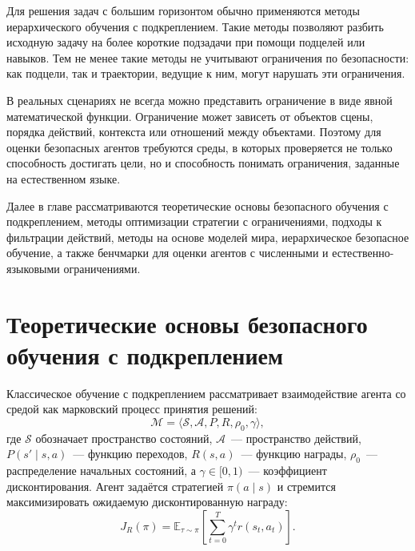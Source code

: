 Для решения задач с большим горизонтом обычно применяются методы иерархического обучения с подкреплением. Такие методы позволяют разбить исходную задачу на более короткие подзадачи при помощи подцелей или навыков. Тем не менее такие методы не учитывают ограничения по безопасности: как подцели, так и траектории, ведущие к ним, могут нарушать эти ограничения.

В реальных сценариях не всегда можно представить ограничение в виде явной математической функции. Ограничение может зависеть от объектов сцены, порядка действий, контекста или отношений между объектами. Поэтому для оценки безопасных агентов требуются среды, в которых проверяется не только способность достигать цели, но и способность понимать ограничения, заданные на естественном языке.

Далее в главе рассматриваются теоретические основы безопасного обучения с подкреплением, методы оптимизации стратегии с ограничениями, подходы к фильтрации действий, методы на основе моделей мира, иерархическое безопасное обучение, а также бенчмарки для оценки агентов с численными и естественно-языковыми ограничениями.

\section{Теоретические основы безопасного обучения с подкреплением}
\label{sec:safe_rl_formalization}

Классическое обучение с подкреплением рассматривает взаимодействие агента со средой как марковский процесс принятия решений:
\begin{equation}
\mathcal{M} = \langle \mathcal{S}, \mathcal{A}, P, R, \rho_0, \gamma \rangle,
\end{equation}
где $\mathcal{S}$ обозначает пространство состояний, $\mathcal{A}$~--- пространство действий, $P(s' \mid s,a)$~--- функцию переходов, $R(s,a)$~--- функцию награды, $\rho_0$~--- распределение начальных состояний, а $\gamma \in [0,1)$~--- коэффициент дисконтирования. Агент задаётся стратегией $\pi(a \mid s)$ и стремится максимизировать ожидаемую дисконтированную награду:
\begin{equation}
J_R(\pi) =
\mathbb{E}_{\tau \sim \pi}
\left[
\sum_{t=0}^{T} \gamma^t r(s_t,a_t)
\right].
\end{equation}

